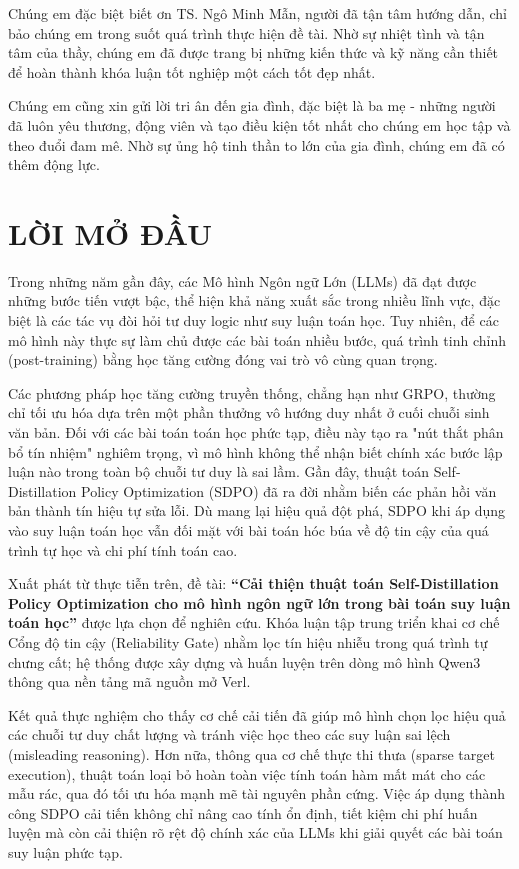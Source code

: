 \documentclass[12pt,a4paper]{report}
\begin{document}
Chúng em đặc biệt biết ơn TS. Ngô Minh Mẫn, người đã tận tâm hướng dẫn, chỉ bảo chúng em trong suốt quá trình thực hiện đề tài. Nhờ sự nhiệt tình và tận tâm của thầy, chúng em đã được trang bị những kiến thức và kỹ năng cần thiết để hoàn thành khóa luận tốt nghiệp một cách tốt đẹp nhất.

Chúng em cũng xin gửi lời tri ân đến gia đình, đặc biệt là ba mẹ - những người đã luôn yêu thương, động viên và tạo điều kiện tốt nhất cho chúng em học tập và theo đuổi đam mê. Nhờ sự ủng hộ tinh thần to lớn của gia đình, chúng em đã có thêm động lực.

\chapter*{LỜI MỞ ĐẦU}
Trong những năm gần đây, các Mô hình Ngôn ngữ Lớn (LLMs) đã đạt được những bước tiến vượt bậc, thể hiện khả năng xuất sắc trong nhiều lĩnh vực, đặc biệt là các tác vụ đòi hỏi tư duy logic như suy luận toán học. Tuy nhiên, để các mô hình này thực sự làm chủ được các bài toán nhiều bước, quá trình tinh chỉnh (post-training) bằng học tăng cường đóng vai trò vô cùng quan trọng. 

Các phương pháp học tăng cường truyền thống, chẳng hạn như GRPO, thường chỉ tối ưu hóa dựa trên một phần thưởng vô hướng duy nhất ở cuối chuỗi sinh văn bản. Đối với các bài toán toán học phức tạp, điều này tạo ra "nút thắt phân bổ tín nhiệm" nghiêm trọng, vì mô hình không thể nhận biết chính xác bước lập luận nào trong toàn bộ chuỗi tư duy là sai lầm. Gần đây, thuật toán Self-Distillation Policy Optimization (SDPO) đã ra đời nhằm biến các phản hồi văn bản thành tín hiệu tự sửa lỗi. Dù mang lại hiệu quả đột phá, SDPO khi áp dụng vào suy luận toán học vẫn đối mặt với bài toán hóc búa về độ tin cậy của quá trình tự học và chi phí tính toán cao.

Xuất phát từ thực tiễn trên, đề tài: \textbf{“Cải thiện thuật toán Self-Distillation Policy Optimization cho mô hình ngôn ngữ lớn trong bài toán suy luận toán học”} được lựa chọn để nghiên cứu. Khóa luận tập trung triển khai cơ chế Cổng độ tin cậy (Reliability Gate) nhằm lọc tín hiệu nhiễu trong quá trình tự chưng cất; hệ thống được xây dựng và huấn luyện trên dòng mô hình Qwen3 thông qua nền tảng mã nguồn mở Verl. 

Kết quả thực nghiệm cho thấy cơ chế cải tiến đã giúp mô hình chọn lọc hiệu quả các chuỗi tư duy chất lượng và tránh việc học theo các suy luận sai lệch (misleading reasoning). Hơn nữa, thông qua cơ chế thực thi thưa (sparse target execution), thuật toán loại bỏ hoàn toàn việc tính toán hàm mất mát cho các mẫu rác, qua đó tối ưu hóa mạnh mẽ tài nguyên phần cứng. Việc áp dụng thành công SDPO cải tiến không chỉ nâng cao tính ổn định, tiết kiệm chi phí huấn luyện mà còn cải thiện rõ rệt độ chính xác của LLMs khi giải quyết các bài toán suy luận phức tạp.
\end{document}
